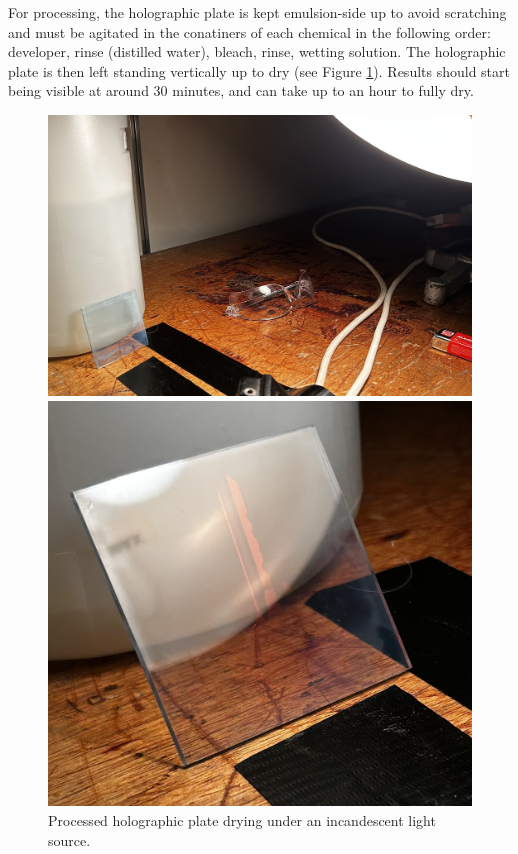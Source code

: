 \documentclass[12pt]{article}
\begin{document}
For processing, the holographic plate is kept emulsion-side up to avoid scratching and must be agitated in the conatiners of each chemical in the following order: developer, rinse (distilled water), bleach, rinse, wetting solution.
The holographic plate is then left standing vertically up to dry (see Figure \ref{fig:12}). Results should start being visible at around 30 minutes, and can take up to an hour to fully dry.

\begin{figure}[H]
    \centering
    \begin{minipage}{.55\textwidth}
        \includegraphics[width=\linewidth]{holo drying.jpeg}
    \end{minipage}
    \hspace{-.5em}
    \begin{minipage}{.385\textwidth}
        \includegraphics[width=\linewidth]{maybe this is actually holo drying.jpeg}
    \end{minipage}
    \caption{\centering Processed holographic plate drying under an incandescent light source.}
    \label{fig:12}
\end{figure}
\end{document}
